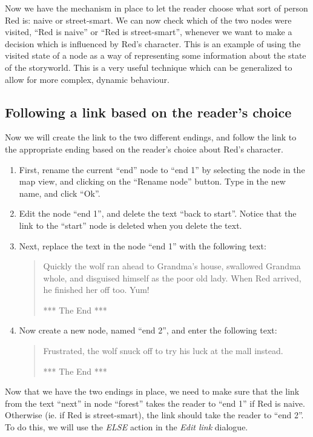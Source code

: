 \documentclass{article}
\begin{document}
Now we have the mechanism in place to let the reader choose what sort of person
Red is: naive or street-smart. We can now check which of the two nodes were
visited, ``Red is naive'' or ``Red is street-smart'', whenever we want to make
a decision which is influenced by Red's character. This is an example of using
the visited state of a node as a way of representing some information about the
state of the storyworld. This is a very useful technique which can be
generalized to allow for more complex, dynamic behaviour.

\subsection{Following a link based on the reader's choice}

Now we will create the link to the two different endings, and follow the link
to the appropriate ending based on the reader's choice about Red's character.

\begin{enumerate}
  \item First, rename the current ``end'' node to ``end 1'' by selecting the
  node in the map view, and clicking on the ``Rename node'' button. Type in the
  new name, and click ``Ok''.
  \item Edit the node ``end 1'', and delete the text ``back to start''. Notice
  that the link to the ``start'' node is deleted when you delete the text.
  \item Next, replace the text in the node ``end 1'' with the following text:
  \begin{quotation}
  Quickly the wolf ran ahead to Grandma's house, swallowed Grandma whole, and
  disguised himself as the poor old lady. When Red arrived, he finished her
  off too. Yum!

  *** The End ***
  \end{quotation}
  \item Now create a new node, named ``end 2'', and enter the following text:
  \begin{quotation}
  Frustrated, the wolf snuck off to try his luck at the mall instead.

  *** The End ***
  \end{quotation}
\end{enumerate}

Now that we have the two endings in place, we need to make sure that the link
from the text ``next'' in node ``forest'' takes the reader to ``end 1'' if Red
is naive. Otherwise (ie. if Red is street-smart), the link should take the
reader to ``end 2''. To do this, we will use the \textit{ELSE} action in the
\textit{Edit link} dialogue.
\end{document}
